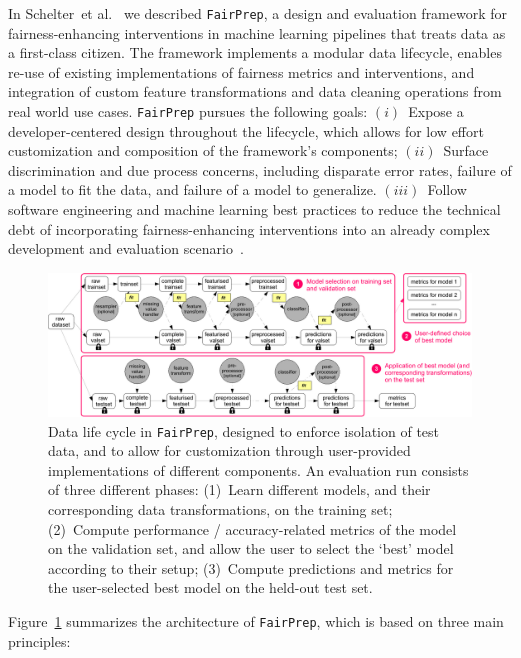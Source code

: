 \documentclass[11pt]{article}
\newcommand{\etal}{et al.\xspace}
\newcommand{\fairprep}{\stt{FairPrep}\xspace}
\newcommand{\stt}[1]{{\footnotesize\texttt{#1}}}
\begin{document}
In Schelter~\etal~\cite{DBLP:conf/edbt/SchelterHKS20} we described \fairprep, a design and evaluation framework for fairness-enhancing interventions in machine learning pipelines that treats data as a first-class citizen.  The framework implements a modular data lifecycle, enables re-use of existing implementations of fairness metrics and interventions, and integration of custom feature transformations and data cleaning operations from real world use cases. \fairprep pursues the following goals: $(i)$~Expose a developer-centered design throughout the lifecycle, which allows for low effort customization and composition of the framework's components; $(ii)$~Surface discrimination and due process concerns, including disparate error rates, failure of a model to fit the data, and failure of a model to generalize. $(iii)$~Follow software engineering and machine learning best practices to reduce the technical debt of incorporating fairness-enhancing interventions into an already complex development and evaluation scenario~\cite{Schelter2018c,Sculley2015}.  


\begin{figure}[t!]
  \centering
  \includegraphics[scale=0.5]{figs/bigpicture-crop.pdf}  
  \caption{Data life cycle in \fairprep, designed to enforce isolation of  test data, and to allow for customization through user-provided implementations of different components. An evaluation run consists of three different phases: (1)~Learn different models, and their corresponding data transformations, on the training set; (2)~Compute performance / accuracy-related metrics of the model on the validation set, and allow the user to select the `best' model according to their setup; (3)~Compute predictions and metrics for the user-selected best model on the held-out test set.}
  \label{fig:bigpicture}
\end{figure}

Figure~\ref{fig:bigpicture} summarizes the architecture of \fairprep, which is based on three main principles: 
\end{document}
